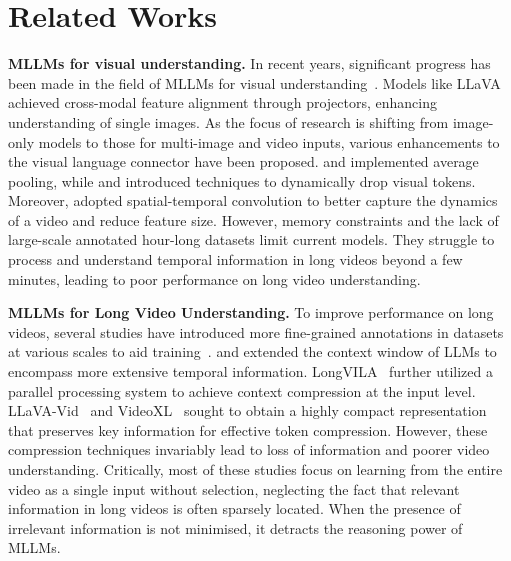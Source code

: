 \section{Related Works}
\noindent\textbf{MLLMs for visual understanding.} In recent years,
significant progress has been made in the field of MLLMs for visual
understanding~\cite{radford2021learning,zhang2024video,maaz2023video}. Models
like LLaVA~\cite{liu2024visual} achieved cross-modal feature
alignment through projectors, enhancing understanding of single
images. As the focus of research is shifting from image-only models to
those for multi-image and video inputs, various enhancements to the
visual language connector have been proposed. \citet{he2024ma} and
\citet{wang2023chatvideo} implemented average pooling, while
\citet{jin2024chat} and \citet{shu2024video} introduced techniques to dynamically drop
visual tokens. Moreover, \citet{cheng2024videollama} adopted
spatial-temporal convolution to better capture the dynamics of a video
and reduce feature size. 
%
However, memory constraints and the lack of large-scale annotated
hour-long datasets limit current models. They struggle to process and
understand temporal information in long videos beyond a few minutes,
leading to poor performance on long video understanding. 

\noindent\textbf{MLLMs for Long Video Understanding.} To improve
performance on long videos, several studies have introduced more
fine-grained annotations in datasets at various scales to aid
training~\cite{fu2024video,wu2024longvideobench}. \citet{zhang2024long}
and \citet{he2024ma} extended the context window of LLMs to encompass more
extensive temporal information. LongVILA~\cite{xue2024longvila}
further utilized a parallel processing system to achieve context
compression at the input level. LLaVA-Vid~\cite{li2025llama} and
VideoXL~\cite{shu2024video} sought to obtain a highly compact
representation that preserves key information for effective token
compression. However, these compression techniques invariably lead to
loss of information and poorer video understanding. Critically,
most of these studies focus on learning from the entire video as a single input without selection, neglecting the fact that relevant
information in long videos is often sparsely located. When the presence of irrelevant information is not minimised, it detracts the reasoning power of MLLMs. 

